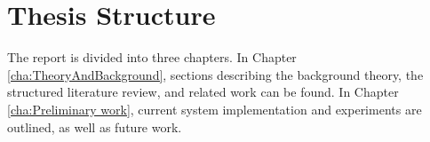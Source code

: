 \section{Thesis Structure}
\label{sec:thesisStructure}
The report is divided into three chapters. In Chapter \ref{cha:TheoryAndBackground}, sections describing the background theory, the structured literature review, and related work can be found.  In Chapter \ref{cha:Preliminary work}, current system implementation and experiments are outlined, as well as future work.